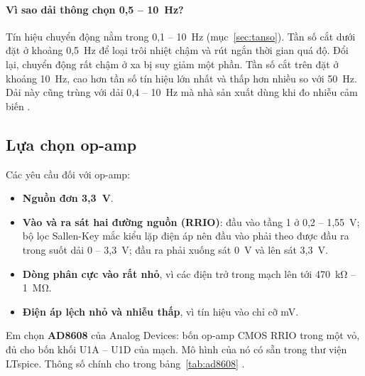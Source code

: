 \paragraph{Vì sao dải thông chọn 0,5 -- 10~Hz?} Tín hiệu chuyển động nằm trong 0,1 -- 10~Hz (mục~\ref{sec:tanso}). Tần số cắt dưới đặt ở khoảng 0,5~Hz để loại trôi nhiệt chậm và rút ngắn thời gian quá độ. Đổi lại, chuyển động rất chậm ở xa bị suy giảm một phần. Tần số cắt trên đặt ở khoảng 10~Hz, cao hơn tần số tín hiệu lớn nhất và thấp hơn nhiều so với 50~Hz. Dải này cũng trùng với dải 0,4 -- 10~Hz mà nhà sản xuất dùng khi đo nhiễu cảm biến \cite{pyd1378}.

\subsection{Lựa chọn op-amp}

Các yêu cầu đối với op-amp:
\begin{itemize}
  \item \textbf{Nguồn đơn 3,3~V}.
  \item \textbf{Vào và ra sát hai đường nguồn (RRIO)}: đầu vào tầng 1 ở 0,2 -- 1,55~V; bộ lọc Sallen-Key mắc kiểu lặp điện áp nên đầu vào phải theo được đầu ra trong suốt dải 0 -- 3,3~V; đầu ra phải xuống sát 0~V và lên sát 3,3~V.
  \item \textbf{Dòng phân cực vào rất nhỏ}, vì các điện trở trong mạch lên tới 470~kΩ -- 1~MΩ.
  \item \textbf{Điện áp lệch nhỏ và nhiễu thấp}, vì tín hiệu vào chỉ cỡ mV.
\end{itemize}

Em chọn \textbf{AD8608} của Analog Devices: bốn op-amp CMOS RRIO trong một vỏ, đủ cho bốn khối U1A -- U1D của mạch. Mô hình của nó có sẵn trong thư viện LTspice. Thông số chính cho trong bảng~\ref{tab:ad8608} \cite{ad8608}.

